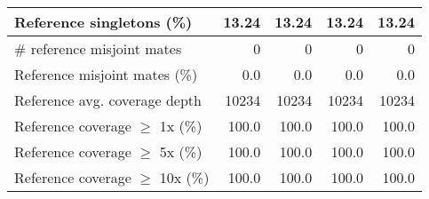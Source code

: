 \documentclass[12pt,a4paper]{article}
\begin{document}
\begin{table}[ht]
\begin{center}
\begin{tabular}{|l*{4}{|r}|}
Reference singletons (\%) & 13.24 & 13.24 & 13.24 & 13.24 \\ \hline
\# reference misjoint mates & 0 & 0 & 0 & 0 \\ \hline
Reference misjoint mates (\%) & 0.0 & 0.0 & 0.0 & 0.0 \\ \hline
Reference avg. coverage depth & 10234 & 10234 & 10234 & 10234 \\ \hline
Reference coverage $\geq$ 1x (\%) & 100.0 & 100.0 & 100.0 & 100.0 \\ \hline
Reference coverage $\geq$ 5x (\%) & 100.0 & 100.0 & 100.0 & 100.0 \\ \hline
Reference coverage $\geq$ 10x (\%) & 100.0 & 100.0 & 100.0 & 100.0 \\ \hline
\end{tabular}
\end{center}
\end{table}
\end{document}
